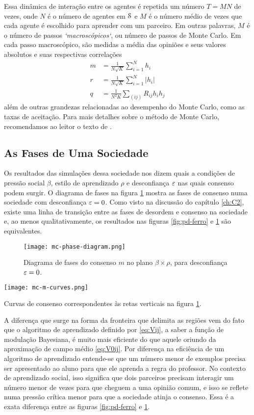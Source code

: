 Essa dinâmica de interação entre os agentes é repetida um número $T = MN$ de vezes, onde $N$ é o número de agentes em $\mathcal{S}$ e $M$ é o número médio de vezes que cada agente é escolhido para aprender com um parceiro.
Em outras palavras, $M$ é o número de passos \emph{`macroscópicos`}, ou número de passos de Monte Carlo.
Em cada passo macroscópico, são medidas a média das opiniões e seus valores absolutos e suas respectivas correlações
\begin{align}
  m & = \frac{1}{N\sqrt{K}}\sum_{i=1}^N h_i \label{eq:def-m}\\
  r & = \frac{1}{N\sqrt{K}}\sum_{i=1}^N |h_i| \label{eq:def-r}\\
  q & = \frac{1}{N^2K} \sum_{(ij)}R_{ij} h_i h_j \label{eq:def-q}
\end{align}
além de outras grandezas relacionadas ao desempenho do Monte Carlo, como as taxas de aceitação.
Para mais detalhes sobre o método de Monte Carlo, recomendamos ao leitor o texto de \parencite{Newman1999}.

\subsection{As Fases de Uma Sociedade}

Os resultados das simulações dessa sociedade nos dizem quais a condições de pressão social $\beta$, estilo de aprendizado $\rho$ e desconfiança $\varepsilon$ nas quais consenso podem surgir.
O diagrama de fases na figura \ref{fig:mc-pd-rho} mostra as fases de consenso numa sociedade com desconfiança $\varepsilon=0$.
Como visto na discussão do capítulo \ref{ch:C2}, existe uma linha de transição entre as fases de desordem e consenso na sociedade e, ao menos qualitativamente, os resultados nas figuras \ref{fig:pd-ferro} e \ref{fig:mc-pd-rho} são equivalentes.

\begin{figure}[t!]\label{fig:mc-pd-rho}
    \centering
    \texttt{[image: mc-phase-diagram.png]}
    \caption{Diagrama de fases do consenso $m$  no plano $\beta \times \rho$, para desconfiança $\varepsilon = 0$.}
\end{figure}
\begin{marginfigure}[-11cm]
    \texttt{[image: mc-m-curves.png]}
    \caption{Curvas de consenso correspondentes às retas verticais na figura \ref{fig:mc-pd-rho}.}
\end{marginfigure}


A diferença que surge na forma da fronteira que delimita as regiões vem do fato que o algoritmo de aprendizado definido por \eqref{eq:Vij}, a saber a função de modulação Bayesiana, é muito mais eficiente do que aquele oriundo da aproximação de campo médio \eqref{eq:V0ij}.
Por diferença na eficiência de um algoritmo de aprendizado entende-se que um número menor de exemplos precisa ser apresentado ao aluno para que ele aprenda a regra do professor.
No contexto de aprendizado social, isso significa que dois parceiros precisam interagir um número menor de vezes para que cheguem a uma opinião comum, e isso se reflete numa pressão crítica menor para que a sociedade atinja o consenso.
Essa é a exata diferença entre as figuras \ref{fig:pd-ferro} e \ref{fig:mc-pd-rho}.

